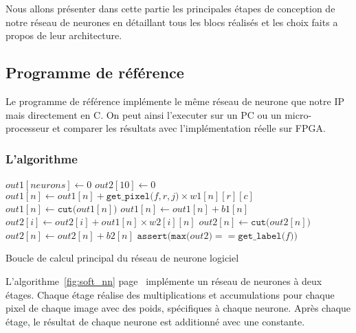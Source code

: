
Nous allons présenter dans cette partie les principales étapes de conception
de notre réseau de neurones en détaillant tous les blocs réalisés et les choix
faits a propos de leur architecture.

\subsection{Programme de référence}
Le programme de référence implémente le même réseau de neurone que notre IP
mais directement en C. On peut ainsi l'executer sur un PC ou un micro-processeur 
et comparer les résultats avec l'implémentation réelle sur FPGA.

\subsubsection{L'algorithme}

\begin{algorithm}
	\SetAlgoLined
	 {
		$out1[neurons] \leftarrow 0$\;
		$out2[10] \leftarrow 0$\;
		 {
			 {
				 {
					$out1[n] \leftarrow out1[n] + \texttt{get\_pixel(}f, r, j\texttt{)} \times w1[n][r][c]$\;
				}
			}
		}
		 {
			$out1[n] \leftarrow \texttt{cut(}out1[n]\texttt{)}$\;
			$out1[n] \leftarrow out1[n] + b1[n]$\;
		}
		 {
			 {
				$out2[i] \leftarrow out2[i] + out1[n] \times w2[i][n]$\;
			}
		}
		 {
			$out2[n] \leftarrow \texttt{cut(}out2[n]\texttt{)}$\;
			$out2[n] \leftarrow out2[n] + b2[n]$\;
		}
		$\texttt{assert(max(}out2\texttt{)} == \texttt{get\_label(}f\texttt{))}$\;
	}
	\caption{Boucle de calcul principal du réseau de neurone logiciel}
	\label{fig:soft_nn}
\end{algorithm}

L'algorithme~\ref{fig:soft_nn} page~\pageref{fig:soft_nn} implémente un réseau de neurones à deux étages.
Chaque étage réalise des multiplications et accumulations pour chaque pixel de
chaque image avec des poids, spécifiques à chaque neurone. Après chaque étage,
le résultat de chaque neurone est additionné avec une constante.

